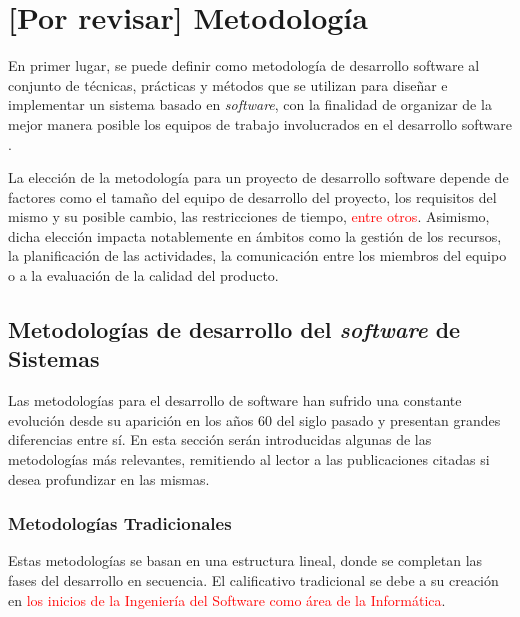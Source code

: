 \chapter{[Por revisar] Metodología}
\label{chapter:metodologia}


En primer lugar, se puede definir como metodología de desarrollo software al conjunto de técnicas, prácticas y métodos que se utilizan para diseñar e implementar un sistema basado en \textit{software}, con la finalidad de organizar de la mejor manera posible los equipos de trabajo involucrados en el desarrollo software \cite{santander_universidades_metodologias_2020}.

La elección de la metodología para un proyecto de desarrollo software depende de factores como el tamaño del equipo de desarrollo del proyecto, los requisitos del mismo y su posible cambio, las restricciones de tiempo,  \textcolor{red}{entre otros}. %
Asimismo, dicha elección impacta notablemente en ámbitos como la gestión de los recursos, la planificación de las actividades, la comunicación entre los miembros del equipo o a la evaluación de la calidad del producto.

\section{Metodologías de desarrollo del \textit{software} de Sistemas}

    Las metodologías para el desarrollo de software han sufrido una constante evolución desde su aparición en los años 60 del siglo pasado y presentan grandes diferencias entre sí. En esta sección serán introducidas algunas de las metodologías más relevantes, remitiendo al lector a las publicaciones citadas si desea profundizar en las mismas.

    \subsection{Metodologías Tradicionales}
    
        Estas metodologías se basan en una estructura lineal, donde se completan las fases del desarrollo en secuencia. El calificativo tradicional se debe a su creación en \textcolor{red}{los inicios de la Ingeniería del Software como área de la Informática}. %
    
